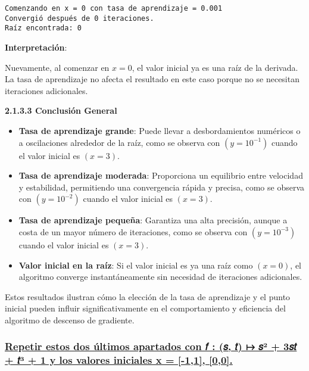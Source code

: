 \documentclass[11pt]{article}
\providecommand{\tightlist}{%
      \setlength{\itemsep}{0pt}\setlength{\parskip}{0pt}}
\begin{document}
    \begin{Verbatim}[commandchars=\\\{\}]
Comenzando en x = 0 con tasa de aprendizaje = 0.001
Convergió después de 0 iteraciones.
Raíz encontrada: 0

    \end{Verbatim}

    \textbf{Interpretación}:

Nuevamente, al comenzar en \(x = 0\), el valor inicial ya es una raíz de
la derivada. La tasa de aprendizaje no afecta el resultado en este caso
porque no se necesitan iteraciones adicionales.

    \textbf{2.1.3.3 Conclusión General}

\begin{itemize}
\tightlist
\item
  \textbf{Tasa de aprendizaje grande}: Puede llevar a desbordamientos
  numéricos o a oscilaciones alrededor de la raíz, como se observa con
  \(( y = 10^{-1} )\) cuando el valor inicial es \(( x = 3 )\).
\item
  \textbf{Tasa de aprendizaje moderada}: Proporciona un equilibrio entre
  velocidad y estabilidad, permitiendo una convergencia rápida y
  precisa, como se observa con \(( y = 10^{-2} )\) cuando el valor
  inicial es \(( x = 3 )\).
\item
  \textbf{Tasa de aprendizaje pequeña}: Garantiza una alta precisión,
  aunque a costa de un mayor número de iteraciones, como se observa con
  \(( y = 10^{-3} )\) cuando el valor inicial es \(( x = 3 )\).
\item
  \textbf{Valor inicial en la raíz}: Si el valor inicial es ya una raíz
  como \(( x = 0 )\), el algoritmo converge instantáneamente sin
  necesidad de iteraciones adicionales.
\end{itemize}

Estos resultados ilustran cómo la elección de la tasa de aprendizaje y
el punto inicial pueden influir significativamente en el comportamiento
y eficiencia del algoritmo de descenso de gradiente.

    \subsubsection{\texorpdfstring{\hyperref[toc0_]{Repetir estos dos últimos apartados con 𝑓 : (𝑠, 𝑡) ↦ 𝑠² + 3𝑠𝑡 + 𝑡³ + 1 y los valores iniciales x = [-1,1], [0,0].}}{}}\label{repetir-estos-dos-uxfaltimos-apartados-con-ux1d453-ux1d460-ux1d461-ux1d460-3ux1d460ux1d461-ux1d461-1-y-los-valores-iniciales-x--11-00.}
\end{document}
